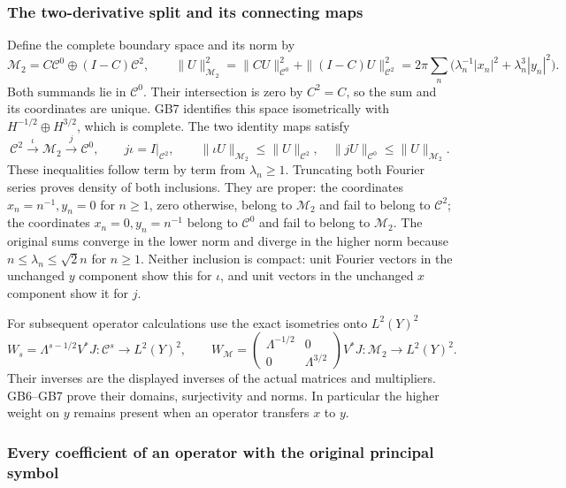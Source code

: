 \documentclass[
  11pt,
]{article}
\begin{document}
\subsubsection{The two-derivative split and its connecting
maps}\label{the-two-derivative-split-and-its-connecting-maps}

Define the complete boundary space and its norm by \[
 \mathcal M_2=C\mathcal C^0\oplus(I-C)\mathcal C^2,\qquad
 \|U\|_{\mathcal M_2}^2
   =\|CU\|_{\mathcal C^0}^2+\|(I-C)U\|_{\mathcal C^2}^2
   =2\pi\sum_n\bigl(\lambda_n^{-1}|x_n|^2+\lambda_n^3|y_n|^2\bigr).
 \tag{GB7}
\] Both summands lie in \(\mathcal C^0\). Their intersection is zero by
\(C^2=C\), so the sum and its coordinates are unique. GB7 identifies
this space isometrically with \(H^{-1/2}\oplus H^{3/2}\), which is
complete. The two identity maps satisfy \[
 \mathcal C^2\xrightarrow{\ \iota\ }\mathcal M_2
 \xrightarrow{\ j\ }\mathcal C^0,\qquad
 j\iota=I|_{\mathcal C^2},\qquad
 \|\iota U\|_{\mathcal M_2}\leq\|U\|_{\mathcal C^2},\quad
 \|jU\|_{\mathcal C^0}\leq\|U\|_{\mathcal M_2}.
 \tag{GB8}
\] These inequalities follow term by term from \(\lambda_n\geq1\).
Truncating both Fourier series proves density of both inclusions. They
are proper: the coordinates \(x_n=n^{-1},y_n=0\) for \(n\geq1\), zero
otherwise, belong to \(\mathcal M_2\) and fail to belong to
\(\mathcal C^2\); the coordinates \(x_n=0,y_n=n^{-1}\) belong to
\(\mathcal C^0\) and fail to belong to \(\mathcal M_2\). The original
sums converge in the lower norm and diverge in the higher norm because
\(n\leq\lambda_n\leq\sqrt2n\) for \(n\geq1\). Neither inclusion is
compact: unit Fourier vectors in the unchanged \(y\) component show this
for \(\iota\), and unit vectors in the unchanged \(x\) component show it
for \(j\).

For subsequent operator calculations use the exact isometries onto
\(L^2(Y)^2\) \[
 W_s=\Lambda^{s-1/2}V^*J:\mathcal C^s\longrightarrow L^2(Y)^2,
 \qquad
 W_{\mathcal M}=\begin{pmatrix}\Lambda^{-1/2}&0\\0&\Lambda^{3/2}\end{pmatrix}
                 V^*J:\mathcal M_2\longrightarrow L^2(Y)^2.
 \tag{GB9}
\] Their inverses are the displayed inverses of the actual matrices and
multipliers. GB6--GB7 prove their domains, surjectivity and norms. In
particular the higher weight on \(y\) remains present when an operator
transfers \(x\) to \(y\).

\subsubsection{Every coefficient of an operator with the original
principal
symbol}\label{every-coefficient-of-an-operator-with-the-original-principal-symbol}
\end{document}

